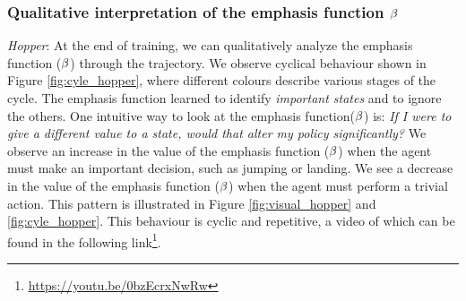 \subsubsection{Qualitative interpretation of the emphasis function $\beta$ }
\emph{Hopper}: At the end of training, we can qualitatively analyze the emphasis function ($\beta$) through the trajectory. We observe cyclical behaviour shown in Figure \ref{fig:cyle_hopper}, where different colours describe various stages of the cycle. The emphasis function learned to identify \emph{important states} and to ignore the others. One intuitive way to look at the emphasis function($\beta$) is: \emph{If I were to give a different value to a state, would that alter my policy significantly?} We observe an increase in the value of the emphasis function ($\beta$) when the agent must make an important decision, such as jumping or landing. We see a decrease in the value of the emphasis function ($\beta$) when the agent must perform a trivial action. This pattern is illustrated in Figure \ref{fig:visual_hopper} and \ref{fig:cyle_hopper}. This behaviour is cyclic and repetitive, a video of which can be found in the following link\footnote{\url{https://youtu.be/0bzEcrxNwRw}{}}.
